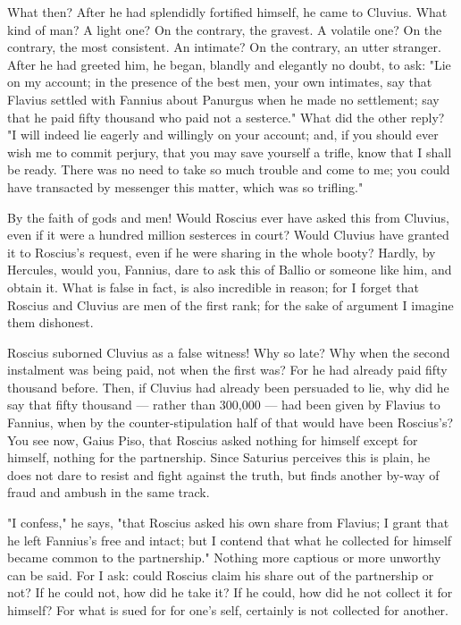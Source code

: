  What then? After he had splendidly fortified himself, he came to Cluvius. What kind of man? A light one? On the contrary, the gravest. A volatile one? On the contrary, the most consistent. An intimate? On the contrary, an utter stranger. After he had greeted him, he began, blandly and elegantly no doubt, to ask: "Lie on my account; in the presence of the best men, your own intimates, say that Flavius settled with Fannius about Panurgus when he made no settlement; say that he paid fifty thousand who paid not a sesterce." What did the other reply? "I will indeed lie eagerly and willingly on your account; and, if you should ever wish me to commit perjury, that you may save yourself a trifle, know that I shall be ready. There was no need to take so much trouble and come to me; you could have transacted by messenger this matter, which was so trifling."

 By the faith of gods and men! Would Roscius ever have asked this from Cluvius, even if it were a hundred million sesterces in court? Would Cluvius have granted it to Roscius's request, even if he were sharing in the whole booty? Hardly, by Hercules, would you, Fannius, dare to ask this of Ballio or someone like him, and obtain it. What is false in fact, is also incredible in reason; for I forget that Roscius and Cluvius are men of the first rank; for the sake of argument I imagine them dishonest.

 Roscius suborned Cluvius as a false witness! Why so late? Why when the second instalment was being paid, not when the first was? For he had already paid fifty thousand before. Then, if Cluvius had already been persuaded to lie, why did he say that fifty thousand --- rather than 300,000 --- had been given by Flavius to Fannius, when by the counter-stipulation half of that would have been Roscius's? You see now, Gaius Piso, that Roscius asked nothing for himself except for himself, nothing for the partnership. Since Saturius perceives this is plain, he does not dare to resist and fight against the truth, but finds another by-way of fraud and ambush in the same track.

 "I confess," he says, "that Roscius asked his own share from Flavius; I grant that he left Fannius's free and intact; but I contend that what he collected for himself became common to the partnership." Nothing more captious or more unworthy can be said. For I ask: could Roscius claim his share out of the partnership or not? If he could not, how did he take it? If he could, how did he not collect it for himself? For what is sued for for one's self, certainly is not collected for another.

